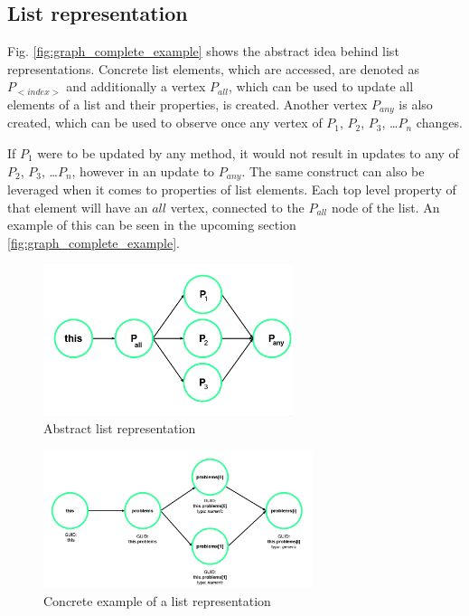 \subsection{List representation}
Fig. \ref{fig:graph_complete_example} shows the abstract idea behind list representations.
Concrete list elements, which are accessed, are denoted as $P_{<index>}$ and additionally a vertex $P_{all}$, which can be used to update all elements of a list\label{concept:why_create_list} and their properties, is created.
Another vertex $P_{any}$ is also created, which can be used to observe once any vertex of $P_1$, $P_2$, $P_3$, \dots $P_n$ changes. 

If $P_1$ were to be updated by any method, it would not result in updates to any of $P_2$, $P_3$, \dots $P_n$, however in an update to $P_{any}$.
 The same construct can also be leveraged when it comes to properties of list elements.
 Each top level property of that element will have an $all$ vertex, connected to the $P_{all}$ node of the list. An example of this can be seen in the upcoming section \ref{fig:graph_complete_example}.  

\label{concept:list_creation}
\begin{figure}[H]
    \centering
    \includegraphics[width=0.65\textwidth]{images/graph_list_generic.png}
     \caption{Abstract list representation}
     \label{fig:graph_list_generic}
\end{figure}

\begin{figure}[H]
    \centering
    \includegraphics[width=0.7\textwidth]{images/graph_list.png}
     \caption{Concrete example of a list representation}
     \label{fig:graph_list}
\end{figure}

